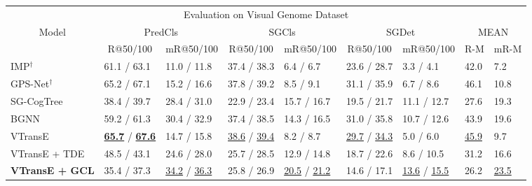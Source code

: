 \documentclass[10pt,twocolumn,letterpaper]{article}
\begin{document}
\begin{table*}[t]
	\small
	\begin{tabular}{p{3.2cm}|p{1.4cm}<{\centering}p{1.4cm}<{\centering}|p{1.4cm}<{\centering}p{1.4cm}<{\centering}|p{1.4cm}<{\centering}p{1.4cm}<{\centering}|p{0.5cm}<{\centering}p{0.5cm}}
		\hline
\multicolumn{9}{c}{\multirow{2}{*}{Evaluation on Visual Genome Dataset}}\\
		\multicolumn{9}{c}{}\\
		\hline
		\multicolumn{1}{c|}{\multirow{2}{*}{Model}} & \multicolumn{2}{c|}{PredCls}& \multicolumn{2}{c|}{SGCls}& \multicolumn{2}{c|}{SGDet}& \multicolumn{2}{c}{MEAN}\\ \cline{2-9} 
		\multicolumn{1}{c|}{}& \multicolumn{1}{c}{R@50/100} & \multicolumn{1}{c|}{mR@50/100} & \multicolumn{1}{c}{R@50/100} & \multicolumn{1}{c|}{mR@50/100} & \multicolumn{1}{c}{R@50/100} & \multicolumn{1}{c|}{mR@50/100} & \multicolumn{1}{c}{R-M} & \multicolumn{1}{c}{mR-M}\\ \hline
		
		{IMP}$^{\dag}$  \cite{suhail2021energy}  & 61.1 / 63.1 & 11.0 / 11.8 & 37.4 / 38.3 & 6.4 / 6.7 & 23.6 / 28.7 & 3.3 / 4.1 & 42.0 & 7.2 \\ 
		{GPS-Net}$^{\dag}$ \cite{li2021bipartite}  & 65.2 / 67.1 & 15.2 / 16.6 & 37.8 / 39.2 & 8.5 / 9.1 & 31.1 / 35.9 & 6.7 / 8.6 & 46.1 & 10.8 \\ 
		SG-CogTree \cite{yu2020cogtree} & 38.4 / 39.7 & 28.4 / 31.0 & 22.9 / 23.4 & 15.7 / 16.7 & 19.5 / 21.7 & 11.1 / 12.7 & 27.6 & 19.3\\ 
		BGNN \cite{li2021bipartite} & 59.2 / 61.3 & 30.4 / 32.9 & 37.4 / 38.5 & 14.3 / 16.5 & 31.0 / 35.8 & 10.7 / 12.6 & 43.9 & 19.6 \\ \hline
		VTransE \cite{tang2020unbiased} & \underline{\textbf{65.7}} / \underline{\textbf{67.6}} & 14.7 / 15.8 & \underline{38.6} / \underline{39.4} & 8.2 / 8.7 & \underline{29.7} / \underline{34.3} & 5.0 / 6.0 & \underline{45.9} & 9.7 \\
		VTransE + TDE \cite{tang2020unbiased} & 48.5 / 43.1 & 24.6 / 28.0 & 25.7 / 28.5 & 12.9 / 14.8 & 18.7 / 22.6 & 8.6 / 10.5 & 31.2 & 16.6 \\
		\textbf{VTransE + GCL} & 35.4 / 37.3 & \underline{34.2} / \underline{36.3} & 25.8 / 26.9 & \underline{20.5} / \underline{21.2} & 14.6 / 17.1 & \underline{13.6} / \underline{15.5} & 26.2 & \underline{23.5} \\\hline
		

\end{tabular}
\end{table*}
\end{document}
